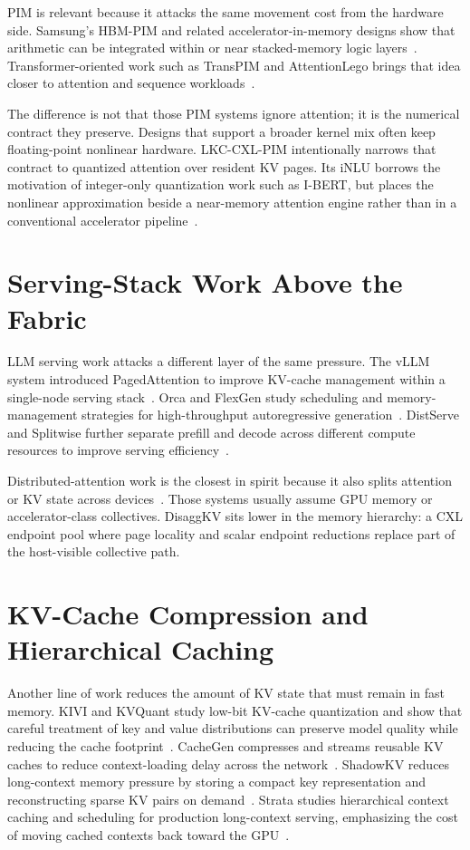 PIM is relevant because it attacks the same movement cost from the hardware side. Samsung's HBM-PIM and related accelerator-in-memory designs show that arithmetic can be integrated within or near stacked-memory logic layers~\cite{samsung_pim, aim_samsung}. Transformer-oriented work such as TransPIM and AttentionLego brings that idea closer to attention and sequence workloads~\cite{transpim, attentionlego}.

The difference is not that those PIM systems ignore attention; it is the numerical contract they preserve. Designs that support a broader kernel mix often keep floating-point nonlinear hardware. LKC-CXL-PIM intentionally narrows that contract to quantized attention over resident KV pages. Its iNLU borrows the motivation of integer-only quantization work such as I-BERT, but places the nonlinear approximation beside a near-memory attention engine rather than in a conventional accelerator pipeline~\cite{llm_int8, pim_quant, goliath}.

\section{Serving-Stack Work Above the Fabric}

LLM serving work attacks a different layer of the same pressure. The vLLM system introduced PagedAttention to improve KV-cache management within a single-node serving stack~\cite{vllm}. Orca and FlexGen study scheduling and memory-management strategies for high-throughput autoregressive generation~\cite{orca, flexgen}. DistServe and Splitwise further separate prefill and decode across different compute resources to improve serving efficiency~\cite{distserve, splitwise}.

Distributed-attention work is the closest in spirit because it also splits attention or KV state across devices~\cite{ring_attention, seq_parallel, infinite_llm}. Those systems usually assume GPU memory or accelerator-class collectives. DisaggKV sits lower in the memory hierarchy: a CXL endpoint pool where page locality and scalar endpoint reductions replace part of the host-visible collective path.

\section{KV-Cache Compression and Hierarchical Caching}

Another line of work reduces the amount of KV state that must remain in fast memory. KIVI and KVQuant study low-bit KV-cache quantization and show that careful treatment of key and value distributions can preserve model quality while reducing the cache footprint~\cite{kivi, kvquant}. CacheGen compresses and streams reusable KV caches to reduce context-loading delay across the network~\cite{cachegen}. ShadowKV reduces long-context memory pressure by storing a compact key representation and reconstructing sparse KV pairs on demand~\cite{shadowkv}. Strata studies hierarchical context caching and scheduling for production long-context serving, emphasizing the cost of moving cached contexts back toward the GPU~\cite{strata}.

